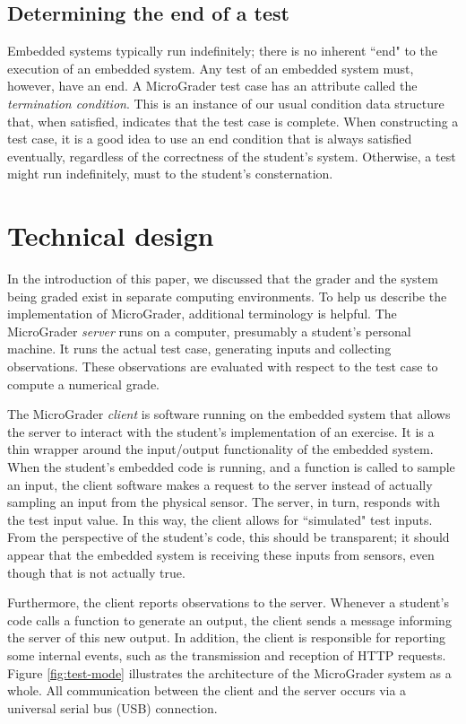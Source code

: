 \documentclass[12pt]{article}
\begin{document}
\subsection{Determining the end of a test}
Embedded systems typically run indefinitely; there is no inherent ``end" to the execution of an embedded system.  Any test of an embedded system must, however, have an end.  A MicroGrader test case has an attribute called the \textit{termination condition}.  This is an instance of our usual condition data structure that, when satisfied, indicates that the test case is complete.  When constructing a test case, it is a good idea to use an end condition that is always satisfied eventually, regardless of the correctness of the student's system.  Otherwise, a test might run indefinitely, must to the student's consternation.



\newpage
\section{Technical design }
In the introduction of this paper, we discussed that the grader and the system being graded exist in separate computing environments.  To help us describe the implementation of MicroGrader, additional terminology is helpful.  The MicroGrader \textit{server} runs on a computer, presumably a student's personal machine.  It runs the actual test case, generating inputs and collecting observations.  These observations are evaluated with respect to the test case to compute a numerical grade.

The MicroGrader \textit{client} is software running on the embedded system that allows the server to interact with the student's implementation of an exercise.  It is a thin wrapper around the input/output functionality of the embedded system.  When the student's embedded code is running, and a function is called to sample an input, the client software makes a request to the server instead of actually sampling an input from the physical sensor.  The server, in turn, responds with the test input value.  In this way, the client allows for 	``simulated" test inputs.  From the perspective of the student's code, this should be transparent; it should appear that the embedded system is receiving these inputs from sensors, even though that is not actually true.

Furthermore, the client reports observations to the server.  Whenever a student's code calls a function to generate an output, the client sends a message informing the server of this new output.  In addition, the client is responsible for reporting some internal events, such as the transmission and reception of HTTP requests.  Figure \ref{fig:test-mode} illustrates the architecture of the MicroGrader system as a whole.  All communication between the client and the server occurs via a universal serial bus (USB) connection.
\end{document}
